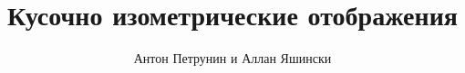\documentclass[oneside,a4paper]{article}
\begin{document}
\title{Кусочно изометрические отображения}
\author{Антон Петрунин и Аллан Яшински}
\date{}
\maketitle



\end{document}
